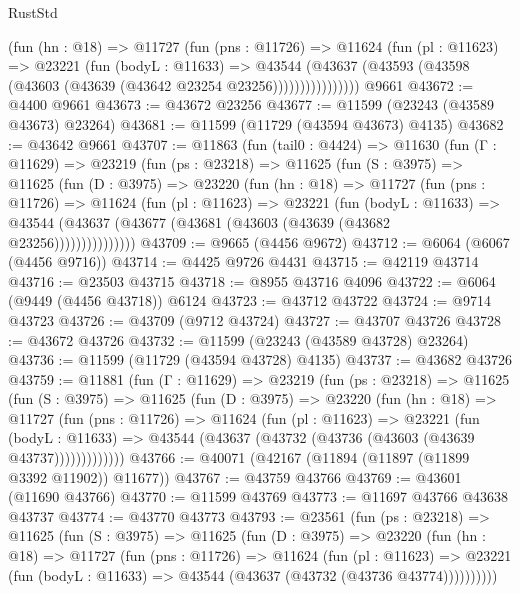 \begin{lexlean}{RustStd}
\begin{coremodule}
                (fun (hn : @18) =>
                @11727
                  (fun (pns : @11726) =>
                  @11624
                    (fun (pl : @11623) =>
                    @23221
                      (fun (bodyL : @11633) =>
                      @43544
                        (@43637
                          (@43593 (@43598 (@43603 (@43639 (@43642 @23254 @23256))))))))))))))))
    @9661
@43672 := @4400 @9661
@43673 := @43672 @23256
@43677 := @11599 (@23243 (@43589 @43673) @23264)
@43681 := @11599 (@11729 (@43594 @43673) @4135)
@43682 := @43642 @9661
@43707 := @11863
    (fun (tail0 : @4424) =>
    @11630
      (fun (Γ : @11629) =>
      @23219
        (fun (ps : @23218) =>
        @11625
          (fun (S : @3975) =>
          @11625
            (fun (D : @3975) =>
            @23220
              (fun (hn : @18) =>
              @11727
                (fun (pns : @11726) =>
                @11624
                  (fun (pl : @11623) =>
                  @23221
                    (fun (bodyL : @11633) =>
                    @43544 (@43637 (@43677 (@43681 (@43603 (@43639 (@43682 @23256)))))))))))))))
@43709 := @9665 (@4456 @9672)
@43712 := @6064 (@6067 (@4456 @9716))
@43714 := @4425 @9726 @4431
@43715 := @42119 @43714
@43716 := @23503 @43715
@43718 := @8955 @43716 @4096
@43722 := @6064 (@9449 (@4456 @43718)) @6124
@43723 := @43712 @43722
@43724 := @9714 @43723
@43726 := @43709 (@9712 @43724)
@43727 := @43707 @43726
@43728 := @43672 @43726
@43732 := @11599 (@23243 (@43589 @43728) @23264)
@43736 := @11599 (@11729 (@43594 @43728) @4135)
@43737 := @43682 @43726
@43759 := @11881
    (fun (Γ : @11629) =>
    @23219
      (fun (ps : @23218) =>
      @11625
        (fun (S : @3975) =>
        @11625
          (fun (D : @3975) =>
          @23220
            (fun (hn : @18) =>
            @11727
              (fun (pns : @11726) =>
              @11624
                (fun (pl : @11623) =>
                @23221
                  (fun (bodyL : @11633) =>
                  @43544 (@43637 (@43732 (@43736 (@43603 (@43639 @43737)))))))))))))
@43766 := @40071 (@42167 (@11894 (@11897 (@11899 @3392 @11902)) @11677))
@43767 := @43759 @43766
@43769 := @43601 (@11690 @43766)
@43770 := @11599 @43769
@43773 := @11697 @43766 @43638 @43737
@43774 := @43770 @43773
@43793 := @23561
    (fun (ps : @23218) =>
    @11625
      (fun (S : @3975) =>
      @11625
        (fun (D : @3975) =>
        @23220
          (fun (hn : @18) =>
          @11727
            (fun (pns : @11726) =>
            @11624
              (fun (pl : @11623) =>
              @23221 (fun (bodyL : @11633) => @43544 (@43637 (@43732 (@43736 @43774))))))))))

\end{coremodule}
\end{lexlean}
